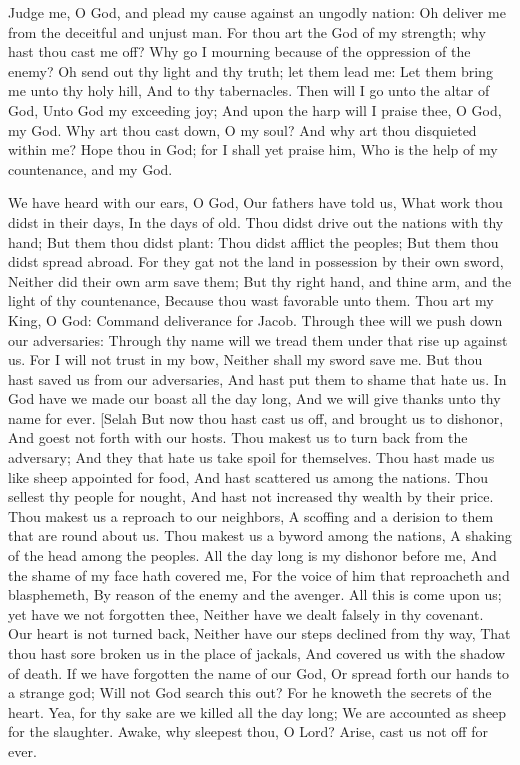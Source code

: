 Judge me, O God, and plead my cause against an ungodly nation: Oh deliver me from the deceitful and unjust man.  For thou art the God of my strength; why hast thou cast me off? Why go I mourning because of the oppression of the enemy?  Oh send out thy light and thy truth; let them lead me: Let them bring me unto thy holy hill, And to thy tabernacles.  Then will I go unto the altar of God, Unto God my exceeding joy; And upon the harp will I praise thee, O God, my God.  Why art thou cast down, O my soul? And why art thou disquieted within me? Hope thou in God; for I shall yet praise him, Who is the help of my countenance, and my God. 

We have heard with our ears, O God, Our fathers have told us, What work thou didst in their days, In the days of old.  Thou didst drive out the nations with thy hand; But them thou didst plant: Thou didst afflict the peoples; But them thou didst spread abroad.  For they gat not the land in possession by their own sword, Neither did their own arm save them; But thy right hand, and thine arm, and the light of thy countenance, Because thou wast favorable unto them.  Thou art my King, O God: Command deliverance for Jacob.  Through thee will we push down our adversaries: Through thy name will we tread them under that rise up against us.  For I will not trust in my bow, Neither shall my sword save me.  But thou hast saved us from our adversaries, And hast put them to shame that hate us.  In God have we made our boast all the day long, And we will give thanks unto thy name for ever. [Selah  But now thou hast cast us off, and brought us to dishonor, And goest not forth with our hosts.  Thou makest us to turn back from the adversary; And they that hate us take spoil for themselves.  Thou hast made us like sheep appointed for food, And hast scattered us among the nations.  Thou sellest thy people for nought, And hast not increased thy wealth by their price.  Thou makest us a reproach to our neighbors, A scoffing and a derision to them that are round about us.  Thou makest us a byword among the nations, A shaking of the head among the peoples.  All the day long is my dishonor before me, And the shame of my face hath covered me,  For the voice of him that reproacheth and blasphemeth, By reason of the enemy and the avenger.  All this is come upon us; yet have we not forgotten thee, Neither have we dealt falsely in thy covenant.  Our heart is not turned back, Neither have our steps declined from thy way,  That thou hast sore broken us in the place of jackals, And covered us with the shadow of death.  If we have forgotten the name of our God, Or spread forth our hands to a strange god;  Will not God search this out? For he knoweth the secrets of the heart.  Yea, for thy sake are we killed all the day long; We are accounted as sheep for the slaughter.  Awake, why sleepest thou, O Lord? Arise, cast us not off for ever.  